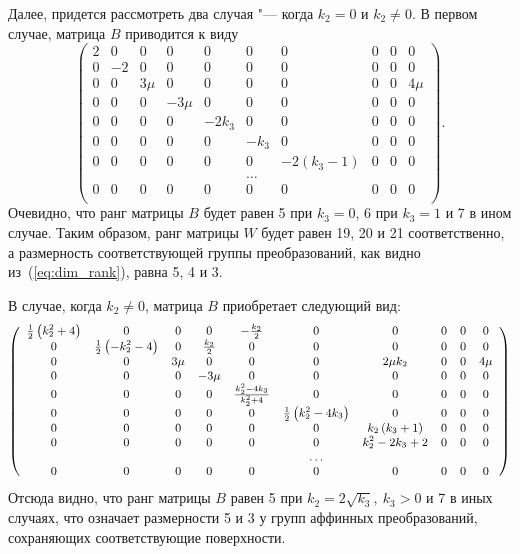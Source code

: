 \documentclass[../main.tex]{subfiles}
\begin{document}
Далее, придется рассмотреть два случая "--- когда $k_2 = 0$ и $k_2 \ne 0$. В первом случае, матрица $B$ приводится к виду
\begin{equation*}
\left(
\begin{array}{cccccccccc}
 2 & 0 & 0 & 0 & 0 & 0 & 0 & 0 & 0 & 0 \\
 0 & -2 & 0 & 0 & 0 & 0 & 0 & 0 & 0 & 0 \\
 0 & 0 & 3 \mu  & 0 & 0 & 0 & 0 & 0 & 0 & 4 \mu  \\
 0 & 0 & 0 & -3 \mu  & 0 & 0 & 0 & 0 & 0 & 0 \\
 0 & 0 & 0 & 0 & -2 k_3 & 0 & 0 & 0 & 0 & 0 \\
 0 & 0 & 0 & 0 & 0 & -k_3 & 0 & 0 & 0 & 0 \\
 0 & 0 & 0 & 0 & 0 & 0 & -2 \left(k_3-1\right) & 0 & 0 & 0 \\
   &   &   &   &   & \hdots &   &   &   &   \\
 0 & 0 & 0 & 0 & 0 & 0 & 0 & 0 & 0 & 0 \\
\end{array}
\right).
\end{equation*}
Очевидно, что ранг матрицы $B$ будет равен 5 при $k_3 = 0$, 6 при $k_3 = 1$ и 7 в ином случае. Таким образом, ранг матрицы $W$ будет равен 19, 20 и 21 соответственно, а размерность соответствующей группы преобразований, как видно из~(\ref{eq:dim_rank}), равна 5, 4 и 3.

В случае, когда $k_2 \ne 0$, матрица $B$ приобретает следующий вид:
\begin{equation*}
{\small\left(
\begin{array}{cccccccccc}
 \frac{1}{2} \left(k_2^2+4\right) & 0 & 0 & 0 & -\frac{k_2}{2} & 0 & 0 & 0 & 0 & 0 \\
 0 & \frac{1}{2} \left(-k_2^2-4\right) & 0 & \frac{k_2}{2} & 0 & 0 & 0 & 0 & 0 & 0 \\
 0 & 0 & 3 \mu  & 0 & 0 & 0 & 2 \mu  k_2 & 0 & 0 & 4 \mu  \\
 0 & 0 & 0 & -3 \mu  & 0 & 0 & 0 & 0 & 0 & 0 \\
 0 & 0 & 0 & 0 & \frac{k_2^2 - 4 k_3}{k_2^2+4} & 0 & 0 & 0 & 0 & 0 \\
 0 & 0 & 0 & 0 & 0 & \frac{1}{2} \left(k_2^2-4 k_3\right) & 0 & 0 & 0 & 0 \\
 0 & 0 & 0 & 0 & 0 & 0 & k_2 \left(k_3+1\right) & 0 & 0 & 0 \\
 0 & 0 & 0 & 0 & 0 & 0 & k_2^2-2 k_3+2 & 0 & 0 & 0 \\
   &   &   &   &   & \hdots &   &   &   &   \\
 0 & 0 & 0 & 0 & 0 & 0 & 0 & 0 & 0 & 0 \\
\end{array}
\right)}
\end{equation*}
Отсюда видно, что ранг матрицы $B$ равен 5 при $k_2 = 2\sqrt{k_3},~k_3 > 0$ и 7 в иных случаях, что означает размерности 5 и 3 у групп аффинных преобразований, сохраняющих соответствующие поверхности.
\end{document}
